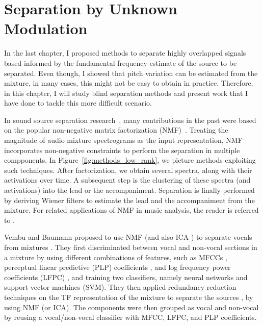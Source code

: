 \chapter{Separation by Unknown Modulation}
\label{cha:unknown}


In the last chapter, I proposed methods to separate highly overlapped signals based informed by the fundamental frequency estimate of the source to be separated.
Even though, I showed that pitch variation can be estimated from the mixture, in many cases, this might not be easy to obtain in practice.
Therefore, in this chapter, I will study blind separation methods and present work that I have done to tackle this more difficult scenario.


In sound source separation research~\cite{vincent14}, many contributions in the past were based on the popular non-negative matrix factorization (NMF)~\cite{lee99,lee01}.
Treating the magnitude of audio mixture spectrograms as the input representation, NMF incorporates non-negative constraints to perform the separation in multiple compponents.
In Figure~\ref{fig:methods_low_rank}, we picture methods exploiting such techniques. After factorization, we obtain several spectra, along with their activations over time. A subsequent step is the clustering of these spectra (and activations) into the lead or the accompaniment. Separation is finally performed by deriving Wiener filters to estimate the lead and the accompaniment from the mixture. For related applications of NMF in music analysis, the reader is referred to \cite{smaragdis03,virtanen07,fevotte09}.

Vembu and Baumann proposed to use NMF (and also ICA \cite{common94}) to separate vocals from mixtures \cite{vembu05}. They first discriminated between vocal and non-vocal sections in a mixture by using different combinations of features, such as MFCCs \cite{david80}, perceptual linear predictive (PLP) coefficients \cite{hermansky90}, and log frequency power coefficients (LFPC) \cite{nwe04}, and training two classifiers, namely neural networks and support vector machines (SVM). They then applied redundancy reduction techniques on the TF representation of the mixture to separate the sources \cite{casey00}, by using NMF (or ICA). The components were then grouped as vocal and non-vocal by reusing a vocal/non-vocal classifier with MFCC, LFPC, and PLP coefficients.

